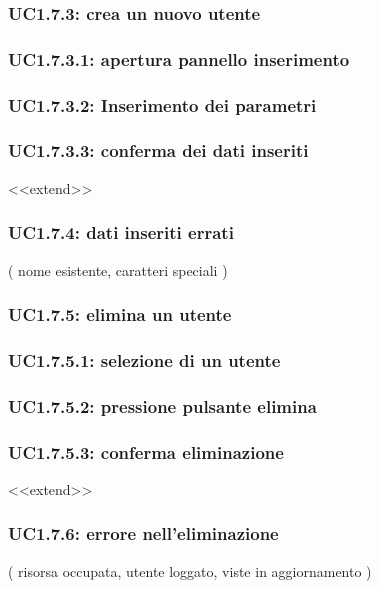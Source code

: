 \subsubsection{UC1.7.3: crea un nuovo utente}
\subsubsection{UC1.7.3.1: apertura pannello inserimento}
\subsubsection{UC1.7.3.2: Inserimento dei parametri}
\subsubsection{UC1.7.3.3: conferma dei dati inseriti}
<<extend>>
\subsubsection{UC1.7.4: dati inseriti errati}
( nome esistente, caratteri speciali )

\subsubsection{UC1.7.5: elimina un utente}
\subsubsection{UC1.7.5.1: selezione di un utente}
\subsubsection{UC1.7.5.2: pressione pulsante elimina}
\subsubsection{UC1.7.5.3: conferma eliminazione}
<<extend>> 
\subsubsection{UC1.7.6: errore nell’eliminazione}
( risorsa occupata, utente loggato, viste in aggiornamento )





